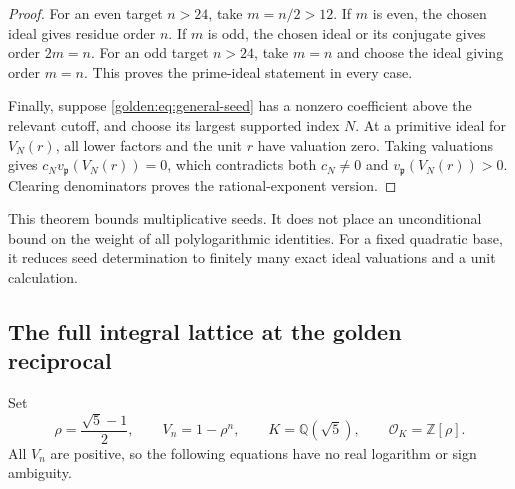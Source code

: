 \begin{proof}
For an even target $n>24$, take $m=n/2>12$.  If $m$ is even, the
chosen ideal gives residue order $n$.  If $m$ is odd, the chosen
ideal or its conjugate gives order $2m=n$.  For an odd target
$n>24$, take $m=n$ and choose the ideal giving order $m=n$.
This proves the prime-ideal statement in every case.

Finally, suppose \eqref{golden:eq:general-seed} has a nonzero
coefficient above the relevant cutoff, and choose its largest
supported index $N$.  At a primitive ideal for $V_N(r)$, all lower
factors and the unit $r$ have valuation zero.  Taking valuations gives
$c_N v_{\mathfrak p}(V_N(r))=0$, which contradicts both $c_N\ne0$
and $v_{\mathfrak p}(V_N(r))>0$.  Clearing denominators proves the
rational-exponent version.
\end{proof}

This theorem bounds multiplicative seeds.  It does not place an
unconditional bound on the weight of all polylogarithmic identities.
For a fixed quadratic base, it reduces seed determination to finitely
many exact ideal valuations and a unit calculation.

\subsection{The full integral lattice at the golden reciprocal}
\label{golden:subsec:integral-lattice}

Set
\[
 \rho=\frac{\sqrt5-1}{2},\qquad V_n=1-\rho^n,
 \qquad K=\mathbb Q(\sqrt5),\qquad\mathcal O_K=\mathbb Z[\rho].
\]
All $V_n$ are positive, so the following equations have no real
logarithm or sign ambiguity.

